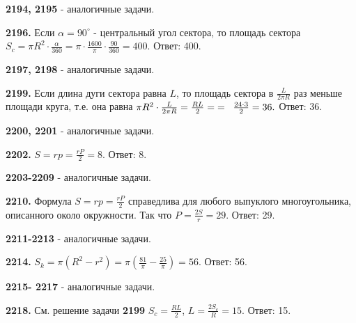 \textbf{2194, 2195} - аналогичные задачи.

\textbf{2196.} Если $\alpha = 90^\circ$ - центральный угол сектора, то площадь сектора $S_c=\pi R^2 \cdot \frac{\alpha}{360}=\pi \cdot \frac{1600}{\pi}\cdot \frac{90}{360} =400.$ \newline \null \hspace*{\fill} Ответ: 400.

\textbf{2197, 2198} - аналогичные задачи.

\textbf{2199.} Если длина дуги сектора равна $L$, то площадь сектора в $\frac{L}{2\pi R}$ раз меньше площади круга, т.е. она равна $\pi R^2 \cdot \frac{L}{2\pi R} = \frac{RL}{2}=\linebreak\;=\;\;\frac{24\cdot 3}{2}=36.$ \newline \null \hspace*{\fill} Ответ: 36.

\textbf{2200, 2201} - аналогичные задачи.

\textbf{2202.} $S = rp = \frac{rP}{2}=8.$ \newline \null \hspace*{\fill} Ответ: 8.

\textbf{2203-2209} - аналогичные задачи.

\textbf{2210.}  Формула $S=rp=\frac{rP}{2}$ справедлива для любого выпуклого многоугольника, описанного около окружности. Так что $P=\frac{2S}{r}=29.$ \newline \null \hspace*{\fill} Ответ: 29.

\textbf{2211-2213} - аналогичные задачи.

\textbf{2214.} $S_k=\pi(R^2-r^2)=\pi\left( \frac{81}{\pi} - \frac{25}{\pi}\right)=56.$ \newline \null \hspace*{\fill} Ответ: 56.

\textbf{2215- 2217} - аналогичные задачи.

\textbf{2218.} См. решение задачи \textbf{2199} $S_c = \frac{RL}{2}$, $L=\frac{2S_c}{R}=15.$ \newline \null \hspace*{\fill} Ответ: 15.